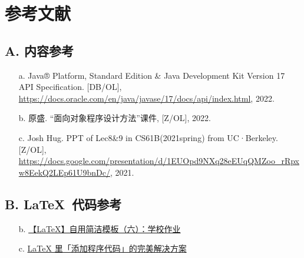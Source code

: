 \chapter{参考文献}

\section{A. 内容参考}
\begin{itemize}
    \item[a.] Java® Platform, Standard Edition \& Java Development Kit Version 17 API Specification. [DB/OL], \newline 
        \url{https://docs.oracle.com/en/java/javase/17/docs/api/index.html}, 2022. 
    \item[b.] 原盛. “面向对象程序设计方法”课件, [Z/OL], 2022. 
    \item[c.] Josh Hug. PPT of Lec8\&9 in CS61B(2021spring) from UC·Berkeley. [Z/OL], 
        \url{https://docs.google.com/presentation/d/1EUOpd9NXq28eEUqQMZoo_rRpxw8EekQ2LEp61U9bnDc/}, 2021.
\end{itemize}

\section{B. \LaTeX~代码参考}
\begin{itemize}
    \item[b.] \href{https://zhuanlan.zhihu.com/p/385727082}{【LaTeX】自用简洁模板（六）：学校作业} 
    \item[c.] \href{https://zhuanlan.zhihu.com/p/65441079}{LaTeX 里「添加程序代码」的完美解决方案}
\end{itemize}